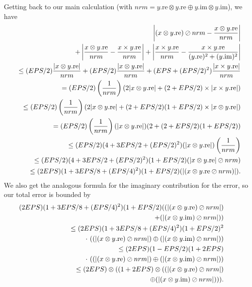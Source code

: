 \phantom{someone}
Getting back to our main calculation (with $nrm = y.\mathrm {re} \otimes y.\mathrm {re} \oplus y.\mathrm {im} \otimes y.\mathrm {im}$), we
have
\begin{eqnarray*}
&&\hskip-16pt\left|(x \otimes y.\mathrm {re}) \oslash nrm - {x \otimes y.\mathrm {re} \over nrm}\right|\\
&&\quad +
\left|{x \otimes y.\mathrm {re} \over nrm} - {x \times y.\mathrm {re} \over nrm}\right| +
\left|{x \times y.\mathrm {re} \over nrm} - 
{x \times y.\mathrm {re}  \over (y.\mathrm {re})^2 + (y.\mathrm {im})^2}\right|\\
&&  \le(EPS/2){|x \otimes y.\mathrm {re}| \over nrm} +
        (EPS/2){|x \otimes   y.\mathrm {re}| \over nrm} +
(EPS + (EPS/2)^2) {|x \times   y.\mathrm {re}| \over nrm}\\
&&  =(EPS/2)\left({1 \over nrm}\right)(2 |x \otimes y.\mathrm {re}| +
(2 + EPS/2) \times |x \times y.\mathrm {re}| )\\
&&  \le (EPS/2)\left({1 \over nrm}\right)(2 |x \otimes y.\mathrm {re}| +
(2 + EPS/2)(1 + EPS/2) \times |x \otimes y.\mathrm {re}| )\\
&&\quad = (EPS/2)\left({1 \over nrm}\right)(|x \otimes y.\mathrm {re}|)
(2 + (2 + EPS/2)(1+EPS/2))\\
&&  \le (EPS/2)(4 + 3EPS/2 + (EPS/2)^2)(|x \otimes y.\mathrm {re}|)\left({1 \over nrm}\right)\\
&& \le (EPS/2)(4 + 3EPS/2 +
(EPS/2)^2)(1+EPS/2)(|x \otimes y.\mathrm {re}| \oslash nrm)\\
&&  \le (2EPS)(1 + 3EPS/8 + (EPS/4)^2)(1+EPS/2)(|(x \otimes y.\mathrm {re} \oslash nrm)|).
\end{eqnarray*}
 We also get the analogous formula for the imaginary contribution for the error, so our total error is
bounded by
\begin{eqnarray*}
&&\hskip-24pt (2EPS)(1 + 3EPS/8 + (EPS/4)^2)(1+EPS/2)((|(x \otimes y.\mathrm {re})\oslash nrm|)\\
&&\quad+(|(x \otimes y.\mathrm {im})\oslash nrm|))\\
&& \le (2EPS)(1 + 3EPS/8 + (EPS/4)^2)(1+EPS/2)^2\\
&&\quad\cdot\ ((|(x \otimes y.\mathrm {re})\oslash nrm|)  \oplus (|(x \otimes
y.\mathrm {im})\oslash nrm|))\\
&&  \le (2EPS)(1 - EPS/2)(1+ 2EPS)\\
&&\quad\cdot\ ((|(x \otimes y.\mathrm {re})\oslash nrm|) \oplus (|(x \otimes y.\mathrm {im})\oslash nrm|))\\
&&  \le (2EPS) \otimes ((1+ 2EPS) \otimes ((|(x \otimes y.\mathrm {re})\oslash nrm|)\\
&&\quad  \oplus (|(x \otimes y.\mathrm {im})\oslash nrm|))).
\end{eqnarray*}


